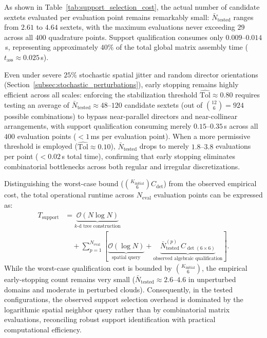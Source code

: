 \documentclass[preprint,12pt]{elsarticle}
\begin{document}
As shown in Table~\ref{tab:support_selection_cost}, the actual number of candidate sextets evaluated per evaluation point remains remarkably small: $\bar{N}_{\mathrm{tested}}$ ranges from $2.61$ to $4.64$ sextets, with the maximum evaluations never exceeding $29$ across all $400$ quadrature points. Support qualification consumes only $0.009\text{--}0.014$\,s, representing approximately $40\%$ of the total global matrix assembly time ($t_{\mathrm{ass}} \approx 0.025$\,s). 

Even under severe $25\%$ stochastic spatial jitter and random director orientations (Section~\ref{subsec:stochastic_perturbations}), early stopping remains highly efficient across all scales: enforcing the stabilization threshold $\widehat{\mathrm{Tol}} \approx 0.80$ requires testing an average of $\bar{N}_{\mathrm{tested}} \approx 48\text{--}120$ candidate sextets (out of $\binom{12}{6} = 924$ possible combinations) to bypass near-parallel directors and near-collinear arrangements, with support qualification consuming merely $0.15\text{--}0.35$\,s across all $400$ evaluation points ($< 1$\,ms per evaluation point). When a more permissive threshold is employed ($\widehat{\mathrm{Tol}} \approx 0.10$), $\bar{N}_{\mathrm{tested}}$ drops to merely $1.8\text{--}3.8$ evaluations per point ($< 0.02$\,s total time), confirming that early stopping eliminates combinatorial bottlenecks across both regular and irregular discretizations.

Distinguishing the worst-case bound ($\binom{K_{\mathrm{initial}}}{6} C_{\det}$) from the observed empirical cost, the total operational runtime across $N_{\mathrm{eval}}$ evaluation points can be expressed as:
\begin{align}
T_{\mathrm{support}} &= \underbrace{\mathcal{O}(N \log N)}_{\text{$k$-d tree construction}} \nonumber \\
&\quad + \sum_{p=1}^{N_{\mathrm{eval}}} \left[ \underbrace{\mathcal{O}(\log N)}_{\text{spatial query}} + \underbrace{\bar{N}_{\mathrm{tested}}^{(p)} \, C_{\det(6 \times 6)}}_{\text{observed algebraic qualification}} \right].
\label{eq:support_total_complexity}
\end{align}
While the worst-case qualification cost is bounded by $\binom{K_{\mathrm{initial}}}{6}$, the empirical early-stopping count remains very small ($\bar{N}_{\mathrm{tested}} \approx 2.6\text{--}4.6$ in unperturbed domains and moderate in perturbed clouds). Consequently, in the tested configurations, the observed support selection overhead is dominated by the logarithmic spatial neighbor query rather than by combinatorial matrix evaluations, reconciling robust support identification with practical computational efficiency.
\end{document}
